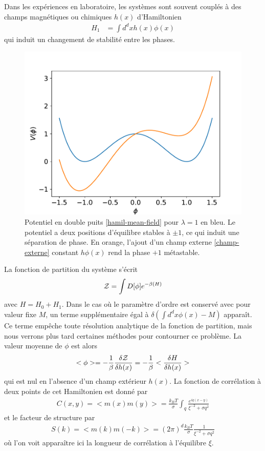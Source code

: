Dans les expériences en laboratoire, les systèmes sont souvent couplés à des champs magnétiques ou chimiques $h(x)$ d'Hamiltonien
\begin{align}
    H_1 &= \int d^dx h(x)\phi(x)
    \label{champ-externe}
\end{align}
qui induit un changement de stabilité entre les phases. 
\begin{figure}
    \centering
    \includegraphics[width=0.5\linewidth]{intro/shift.pdf}
    \caption{Potentiel en double puits \ref{hamil-mean-field} pour $\lambda = 1$ en bleu. Le potentiel a deux positions d'équilibre stables à $\pm1$, ce qui induit une séparation de phase. En orange, l'ajout d'un champ externe \ref{champ-externe} constant $h \phi(x)$ rend la phase $+1$ métastable.}
\end{figure}

La fonction de partition du système s'écrit
\begin{align}
    \mathcal{Z} = \int D[\phi] e^{-\beta( H)}
\end{align}
avec $H= H_0 + H_1$. Dans le cas où le paramètre d'ordre est conservé avec pour valeur fixe $M$, un terme supplémentaire égal à $\delta(\int d^dx \phi(x)-M)$ apparaît. Ce terme empêche toute résolution analytique de la fonction de partition, mais nous verrons plus tard certaines méthodes pour contourner ce problème.
La valeur moyenne de $\phi$ est alors
\begin{align}
    <\phi> = - \frac{1}{\beta} \frac{\delta \mathcal{Z}}{\delta h(x)} = - \frac{1}{\beta} <\frac{\delta H}{\delta h(x)} >
\end{align}
qui est nul en l'absence d'un champ extérieur $h(x)$. La fonction de corrélation à deux points de cet Hamiltonien est donné par 
\begin{align}
    C(x,y) = <m(x)m(y)> =  \frac{k_B T}{\sigma} \int_q \frac{e^{iq(x-y)}}{\xi^{-2}+ \sigma q^2}
\end{align}
et le facteur de structure  par
\begin{align}
    S(k) = <m(k)m(-k)> = (2\pi)^d  \frac{k_B T}{\sigma} \frac{1}{\xi^{-2}+ \sigma q^2}
\end{align}
où l'on voit apparaître ici la longueur de corrélation à l'équilibre $\xi$. 

